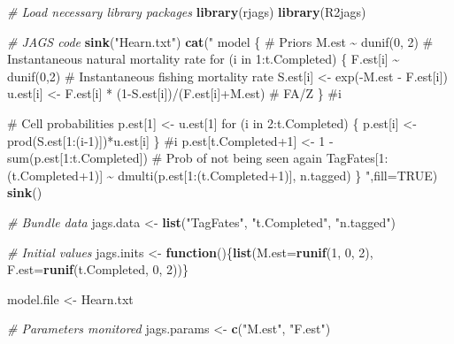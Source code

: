\documentclass[
]{krantz}
\makeatletter
\newenvironment{Shaded}{\begin{snugshade}}{\end{snugshade}}
\newcommand{\AttributeTok}[1]{\textcolor[rgb]{0.27,0.27,0.27}{#1}}
\newcommand{\CommentTok}[1]{\textcolor[rgb]{0.37,0.37,0.37}{\textit{#1}}}
\newcommand{\ConstantTok}[1]{\textcolor[rgb]{0.37,0.37,0.37}{#1}}
\newcommand{\ControlFlowTok}[1]{\textcolor[rgb]{0.27,0.27,0.27}{\textbf{#1}}}
\newcommand{\DecValTok}[1]{\textcolor[rgb]{0.06,0.06,0.06}{#1}}
\newcommand{\FunctionTok}[1]{\textcolor[rgb]{0.27,0.27,0.27}{\textbf{#1}}}
\newcommand{\NormalTok}[1]{#1}
\newcommand{\OtherTok}[1]{\textcolor[rgb]{0.37,0.37,0.37}{#1}}
\newcommand{\StringTok}[1]{\textcolor[rgb]{0.5,0.5,0.5}{#1}}
\newenvironment{kframe}{%
\medskip{}
\setlength{\fboxsep}{.8em}
 \def\at@end@of@kframe{}%
 \ifinner\ifhmode%
  \def\at@end@of@kframe{\end{minipage}}%
  \begin{minipage}{\columnwidth}%
 \fi\fi%
 \def\FrameCommand##1{\hskip\@totalleftmargin \hskip-\fboxsep
 \colorbox{shadecolor}{##1}\hskip-\fboxsep
     \hskip-\linewidth \hskip-\@totalleftmargin \hskip\columnwidth}%
 \MakeFramed {\advance\hsize-\width
   \@totalleftmargin\z@ \linewidth\hsize
   \@setminipage}}%
 {\par\unskip\endMakeFramed%
 \at@end@of@kframe}
\renewenvironment{Shaded}{\begin{kframe}}{\end{kframe}}
\makeatother
\begin{document}
\begin{Shaded}
\begin{Highlighting}[]
\CommentTok{\# Load necessary library packages}
\FunctionTok{library}\NormalTok{(rjags)}
\FunctionTok{library}\NormalTok{(R2jags)}

\CommentTok{\# JAGS code}
\FunctionTok{sink}\NormalTok{(}\StringTok{"Hearn.txt"}\NormalTok{)}
\FunctionTok{cat}\NormalTok{(}\StringTok{"}
\StringTok{  model \{}
\StringTok{  \# Priors}
\StringTok{  M.est \textasciitilde{} dunif(0, 2)  \# Instantaneous natural mortality rate}
\StringTok{  for (i in 1:t.Completed) \{}
\StringTok{     F.est[i] \textasciitilde{} dunif(0,2) \# Instantaneous fishing mortality rate}
\StringTok{     S.est[i] \textless{}{-} exp({-}M.est {-} F.est[i])}
\StringTok{     u.est[i] \textless{}{-} F.est[i] * (1{-}S.est[i])/(F.est[i]+M.est) \# FA/Z}
\StringTok{  \} \#i}

\StringTok{\# Cell probabilities}
\StringTok{  p.est[1] \textless{}{-} u.est[1]}
\StringTok{  for (i in 2:t.Completed) \{}
\StringTok{    p.est[i] \textless{}{-} prod(S.est[1:(i{-}1)])*u.est[i]}
\StringTok{      \} \#i}
\StringTok{    p.est[t.Completed+1] \textless{}{-} 1 {-} sum(p.est[1:t.Completed])}
\StringTok{      \# Prob of not being seen again}
\StringTok{  TagFates[1:(t.Completed+1)] \textasciitilde{} dmulti(p.est[1:(t.Completed+1)],}
\StringTok{                                n.tagged)}
\StringTok{ \}}
\StringTok{  "}\NormalTok{,}\AttributeTok{fill=}\ConstantTok{TRUE}\NormalTok{)}
\FunctionTok{sink}\NormalTok{()}

\CommentTok{\# Bundle data}
\NormalTok{jags.data }\OtherTok{\textless{}{-}} \FunctionTok{list}\NormalTok{(}\StringTok{"TagFates"}\NormalTok{, }\StringTok{"t.Completed"}\NormalTok{, }\StringTok{"n.tagged"}\NormalTok{)}

\CommentTok{\# Initial values}
\NormalTok{jags.inits }\OtherTok{\textless{}{-}} \ControlFlowTok{function}\NormalTok{()\{}\FunctionTok{list}\NormalTok{(}\AttributeTok{M.est=}\FunctionTok{runif}\NormalTok{(}\DecValTok{1}\NormalTok{, }\DecValTok{0}\NormalTok{, }\DecValTok{2}\NormalTok{), }
                              \AttributeTok{F.est=}\FunctionTok{runif}\NormalTok{(t.Completed, }\DecValTok{0}\NormalTok{, }\DecValTok{2}\NormalTok{))\}}

\NormalTok{model.file }\OtherTok{\textless{}{-}} \StringTok{\textquotesingle{}Hearn.txt\textquotesingle{}}

\CommentTok{\# Parameters monitored}
\NormalTok{jags.params }\OtherTok{\textless{}{-}} \FunctionTok{c}\NormalTok{(}\StringTok{"M.est"}\NormalTok{, }\StringTok{"F.est"}\NormalTok{)}


\end{Highlighting}
\end{Shaded}
\end{document}

